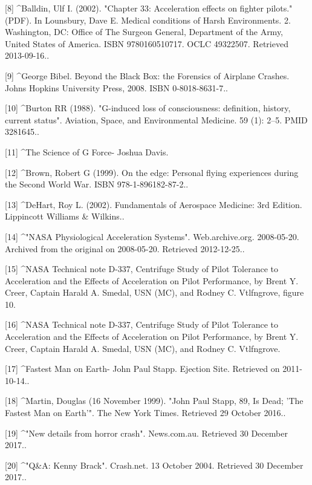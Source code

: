 [8]
^Balldin, Ulf I. (2002). "Chapter 33: Acceleration effects on fighter pilots." (PDF). In Lounsbury, Dave E. Medical conditions of Harsh Environments. 2. Washington, DC: Office of The Surgeon General, Department of the Army, United States of America. ISBN 9780160510717. OCLC 49322507. Retrieved 2013-09-16..

[9]
^George Bibel. Beyond the Black Box: the Forensics of Airplane Crashes. Johns Hopkins University Press, 2008. ISBN 0-8018-8631-7..

[10]
^Burton RR (1988). "G-induced loss of consciousness: definition, history, current status". Aviation, Space, and Environmental Medicine. 59 (1): 2–5. PMID 3281645..

[11]
^The Science of G Force- Joshua Davis.

[12]
^Brown, Robert G (1999). On the edge: Personal flying experiences during the Second World War. ISBN 978-1-896182-87-2..

[13]
^DeHart, Roy L. (2002). Fundamentals of Aerospace Medicine: 3rd Edition. Lippincott Williams & Wilkins..

[14]
^"NASA Physiological Acceleration Systems". Web.archive.org. 2008-05-20. Archived from the original on 2008-05-20. Retrieved 2012-12-25..

[15]
^NASA Technical note D-337, Centrifuge Study of Pilot Tolerance to Acceleration and the Effects of Acceleration on Pilot Performance, by Brent Y. Creer, Captain Harald A. Smedal, USN (MC), and Rodney C. Vtlfngrove, figure 10.

[16]
^NASA Technical note D-337, Centrifuge Study of Pilot Tolerance to Acceleration and the Effects of Acceleration on Pilot Performance, by Brent Y. Creer, Captain Harald A. Smedal, USN (MC), and Rodney C. Vtlfngrove.

[17]
^Fastest Man on Earth- John Paul Stapp. Ejection Site. Retrieved on 2011-10-14..

[18]
^Martin, Douglas (16 November 1999). "John Paul Stapp, 89, Is Dead; 'The Fastest Man on Earth'". The New York Times. Retrieved 29 October 2016..

[19]
^"New details from horror crash". News.com.au. Retrieved 30 December 2017..

[20]
^"Q&A: Kenny Brack". Crash.net. 13 October 2004. Retrieved 30 December 2017..

